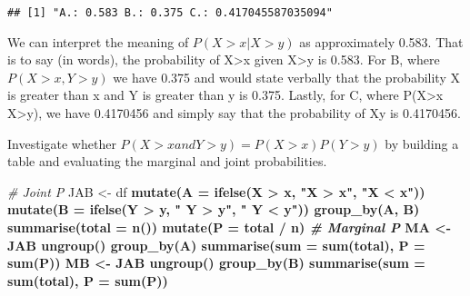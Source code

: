 \documentclass[
]{article}
\newenvironment{Shaded}{\begin{snugshade}}{\end{snugshade}}
\newcommand{\CommentTok}[1]{\textcolor[rgb]{0.56,0.35,0.01}{\textit{#1}}}
\newcommand{\DataTypeTok}[1]{\textcolor[rgb]{0.13,0.29,0.53}{#1}}
\newcommand{\KeywordTok}[1]{\textcolor[rgb]{0.13,0.29,0.53}{\textbf{#1}}}
\newcommand{\NormalTok}[1]{#1}
\newcommand{\OperatorTok}[1]{\textcolor[rgb]{0.81,0.36,0.00}{\textbf{#1}}}
\newcommand{\StringTok}[1]{\textcolor[rgb]{0.31,0.60,0.02}{#1}}
\begin{document}
\begin{verbatim}
## [1] "A.: 0.583 B.: 0.375 C.: 0.417045587035094"
\end{verbatim}

We can interpret the meaning of \(P(X>x | X>y)\) as approximately 0.583.
That is to say (in words), the probability of X\textgreater x given
X\textgreater y is 0.583. For B, where \(P(X>x, Y>y)\) we have 0.375 and
would state verbally that the probability X is greater than x and Y is
greater than y is 0.375. Lastly, for C, where P(X\textgreater x
\textbar{} X\textgreater y), we have 0.4170456 and simply say that the
probability of Xy is 0.4170456.

Investigate whether \(P(X>x and Y>y)=P(X>x)P(Y>y)\) by building a table
and evaluating the marginal and joint probabilities.

\begin{Shaded}
\begin{Highlighting}[]
\CommentTok{# Joint P}
\NormalTok{JAB <-}\StringTok{ }\NormalTok{df }\OperatorTok{%>%}\StringTok{ }
\StringTok{  }\KeywordTok{mutate}\NormalTok{(}\DataTypeTok{A =} \KeywordTok{ifelse}\NormalTok{(X }\OperatorTok{>}\StringTok{ }\NormalTok{x, }\StringTok{"X > x"}\NormalTok{, }\StringTok{"X < x"}\NormalTok{)) }\OperatorTok{%>%}\StringTok{ }
\StringTok{  }\KeywordTok{mutate}\NormalTok{(}\DataTypeTok{B =} \KeywordTok{ifelse}\NormalTok{(Y }\OperatorTok{>}\StringTok{ }\NormalTok{y, }\StringTok{" Y > y"}\NormalTok{, }\StringTok{" Y < y"}\NormalTok{)) }\OperatorTok{%>%}\StringTok{ }
\StringTok{  }\KeywordTok{group_by}\NormalTok{(A, B) }\OperatorTok{%>%}\StringTok{ }
\StringTok{  }\KeywordTok{summarise}\NormalTok{(}\DataTypeTok{total =} \KeywordTok{n}\NormalTok{()) }\OperatorTok{%>%}\StringTok{ }
\StringTok{  }\KeywordTok{mutate}\NormalTok{(}\DataTypeTok{P =}\NormalTok{ total }\OperatorTok{/}\StringTok{ }\NormalTok{n)}
\CommentTok{# Marginal P}
\NormalTok{MA <-}\StringTok{ }\NormalTok{JAB }\OperatorTok{%>%}\StringTok{ }
\StringTok{  }\KeywordTok{ungroup}\NormalTok{() }\OperatorTok{%>%}\StringTok{ }
\StringTok{  }\KeywordTok{group_by}\NormalTok{(A) }\OperatorTok{%>%}\StringTok{ }
\StringTok{  }\KeywordTok{summarise}\NormalTok{(}\DataTypeTok{sum =} \KeywordTok{sum}\NormalTok{(total), }\DataTypeTok{P =} \KeywordTok{sum}\NormalTok{(P))}
\NormalTok{MB <-}\StringTok{ }\NormalTok{JAB }\OperatorTok{%>%}\StringTok{ }
\StringTok{  }\KeywordTok{ungroup}\NormalTok{() }\OperatorTok{%>%}\StringTok{ }
\StringTok{  }\KeywordTok{group_by}\NormalTok{(B) }\OperatorTok{%>%}\StringTok{ }
\StringTok{  }\KeywordTok{summarise}\NormalTok{(}\DataTypeTok{sum =} \KeywordTok{sum}\NormalTok{(total), }\DataTypeTok{P =} \KeywordTok{sum}\NormalTok{(P))}
}}}}}}}}}}}
\end{Highlighting}
\end{Shaded}
\end{document}
